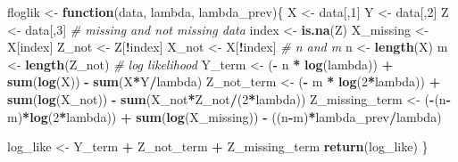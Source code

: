 \documentclass[
]{article}
\newenvironment{Shaded}{\begin{snugshade}}{\end{snugshade}}
\newcommand{\CommentTok}[1]{\textcolor[rgb]{0.56,0.35,0.01}{\textit{#1}}}
\newcommand{\ControlFlowTok}[1]{\textcolor[rgb]{0.13,0.29,0.53}{\textbf{#1}}}
\newcommand{\DecValTok}[1]{\textcolor[rgb]{0.00,0.00,0.81}{#1}}
\newcommand{\KeywordTok}[1]{\textcolor[rgb]{0.13,0.29,0.53}{\textbf{#1}}}
\newcommand{\NormalTok}[1]{#1}
\newcommand{\OperatorTok}[1]{\textcolor[rgb]{0.81,0.36,0.00}{\textbf{#1}}}
\newcommand{\StringTok}[1]{\textcolor[rgb]{0.31,0.60,0.02}{#1}}
\begin{document}
\begin{Shaded}
\begin{Highlighting}[]
\NormalTok{floglik <-}\StringTok{ }\ControlFlowTok{function}\NormalTok{(data, lambda, lambda_prev)\{}
\NormalTok{  X <-}\StringTok{ }\NormalTok{data[,}\DecValTok{1}\NormalTok{]}
\NormalTok{  Y <-}\StringTok{ }\NormalTok{data[,}\DecValTok{2}\NormalTok{]}
\NormalTok{  Z <-}\StringTok{ }\NormalTok{data[,}\DecValTok{3}\NormalTok{]}
  \CommentTok{# missing and not missing data}
\NormalTok{  index <-}\StringTok{ }\KeywordTok{is.na}\NormalTok{(Z)}
\NormalTok{  X_missing <-}\StringTok{ }\NormalTok{X[index]}
\NormalTok{  Z_not <-}\StringTok{ }\NormalTok{Z[}\OperatorTok{!}\NormalTok{index]}
\NormalTok{  X_not <-}\StringTok{ }\NormalTok{X[}\OperatorTok{!}\NormalTok{index]}
  \CommentTok{# n and m}
\NormalTok{  n <-}\StringTok{ }\KeywordTok{length}\NormalTok{(X)}
\NormalTok{  m <-}\StringTok{ }\KeywordTok{length}\NormalTok{(Z_not)}
  \CommentTok{# log likelihood}
\NormalTok{  Y_term <-}\StringTok{ }\NormalTok{(}\OperatorTok{-}\StringTok{ }\NormalTok{n }\OperatorTok{*}\StringTok{ }\KeywordTok{log}\NormalTok{(lambda)) }\OperatorTok{+}\StringTok{ }\KeywordTok{sum}\NormalTok{(}\KeywordTok{log}\NormalTok{(X)) }\OperatorTok{-}\StringTok{ }\KeywordTok{sum}\NormalTok{(X}\OperatorTok{*}\NormalTok{Y}\OperatorTok{/}\NormalTok{lambda)}
\NormalTok{  Z_not_term <-}\StringTok{ }\NormalTok{(}\OperatorTok{-}\StringTok{ }\NormalTok{m }\OperatorTok{*}\StringTok{ }\KeywordTok{log}\NormalTok{(}\DecValTok{2}\OperatorTok{*}\NormalTok{lambda)) }\OperatorTok{+}\StringTok{ }\KeywordTok{sum}\NormalTok{(}\KeywordTok{log}\NormalTok{(X_not)) }\OperatorTok{-}\StringTok{ }\KeywordTok{sum}\NormalTok{(X_not}\OperatorTok{*}\NormalTok{Z_not}\OperatorTok{/}\NormalTok{(}\DecValTok{2}\OperatorTok{*}\NormalTok{lambda))}
\NormalTok{  Z_missing_term <-}\StringTok{ }\NormalTok{(}\OperatorTok{-}\NormalTok{(n}\OperatorTok{-}\NormalTok{m)}\OperatorTok{*}\KeywordTok{log}\NormalTok{(}\DecValTok{2}\OperatorTok{*}\NormalTok{lambda)) }\OperatorTok{+}\StringTok{ }\KeywordTok{sum}\NormalTok{(}\KeywordTok{log}\NormalTok{(X_missing)) }\OperatorTok{-}\StringTok{ }\NormalTok{((n}\OperatorTok{-}\NormalTok{m)}\OperatorTok{*}\NormalTok{lambda_prev}\OperatorTok{/}\NormalTok{lambda)}
  
\NormalTok{  log_like <-}\StringTok{ }\NormalTok{Y_term }\OperatorTok{+}\StringTok{ }\NormalTok{Z_not_term }\OperatorTok{+}\StringTok{ }\NormalTok{Z_missing_term}
  \KeywordTok{return}\NormalTok{(log_like)}
\NormalTok{\}}


\end{Highlighting}
\end{Shaded}
\end{document}
